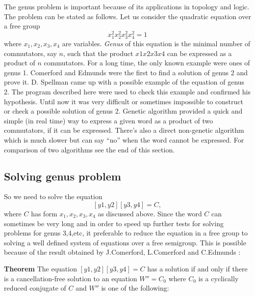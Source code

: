 \documentclass{article}
\begin{document}
The genus problem is important because of its applications in topology
and logic. The problem can be stated as follows. Let us consider the
quadratic equation over a free group
\[
x_1^2 x_2^2 x_3^2 x_4^2 = 1 
\]
where $x_1,x_2,x_3,x_4$ are variables. {\em Genus} of this equation is
the minimal number of commutators, say $n$, such that the product $x1
x2 x3 x4$ can be expressed as a product of $n$ commutators. For a long
time, the only known example were ones of genus 1. Comerford and
Edmunds \cite{C&E:Solution} were the first to find a solution of genus
2 and prove it. D. Spellman \cite{Spellman} came up with a possible
example of the equation of genus 2. The program described here were
used to check this example and confirmed his hypothesis. Until now it
was very difficult or sometimes impossible to construct or check a
possible solution of genus 2. Genetic algorithm provided a quick and
simple (in real time) way to express a given word as a product of two
commutators, if it can be expressed. There's also a direct non-genetic
algorithm which is much slower but can say ``no'' when the word cannot
be expressed. For comparison of two algorithms see the end of this
section.

\subsection{Solving genus problem}

So we need to solve the equation 
\[
[y1,y2][y3,y4] = C,
\]
where $C$ has form $x_1,x_2,x_3,x_4$ as discussed above. Since the
word $C$ can sometimes be very long and in order to speed up further
tests for solving problems for genus 3,4,etc, it preferable to reduce
the equation in a free group to solving a well defined system of
equations over a free semigroup. This is possible because of the
result obtained by J.Comerford, L.Comerford and C.Edmunds \cite{CC&E}:

\vspace{3mm}
{\bf Theorem} The equation $[y1,y2][y3,y4] = C$ has a solution if and
only if there is a cancellation-free solution to an equation $W'' =
C_0$ where $C_0$ is a cyclically reduced conjugate of $C$ and $W''$ is
one of the following:
\end{document}
